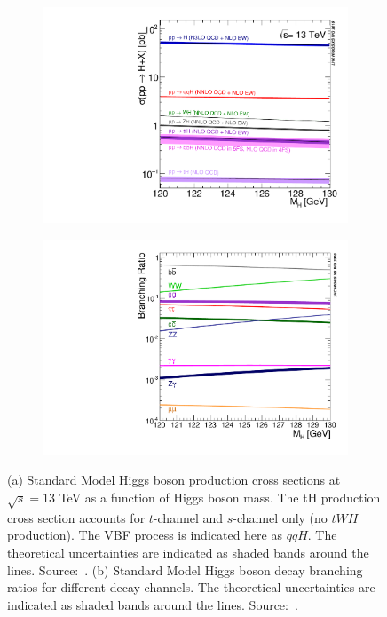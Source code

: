 \begin{figure}[htbp]
  \centering
  \begin{subfigure}[htbp]{0.48\textwidth}
    \centering
    \includegraphics[width=\textwidth]{figures_and_tables/theory/higgs_prod_modes.pdf}
    \caption{}
    \label{higgs_prod_modes}
  \end{subfigure}
  \hfill
  \begin{subfigure}[htbp]{0.48\textwidth}
    \centering
    \includegraphics[width=\textwidth]{figures_and_tables/theory/higgs_decays.pdf}
    \caption{}
    \label{higgs_decays}
  \end{subfigure}
  \caption{(a) Standard Model Higgs boson production cross sections at $\sqrt{s}=13$ TeV as a function of Higgs boson mass. The tH production cross section accounts for $t$-channel and $s$-channel only (no $tWH$ production). The VBF process is indicated here as $qqH$. The theoretical uncertainties are indicated as shaded bands around the lines. Source:~\cite{deFlorian:2016spz}. (b) Standard Model Higgs boson decay branching ratios for different decay channels. The theoretical uncertainties are indicated as shaded bands around the lines. Source:~\cite{deFlorian:2016spz}.}
\end{figure}

